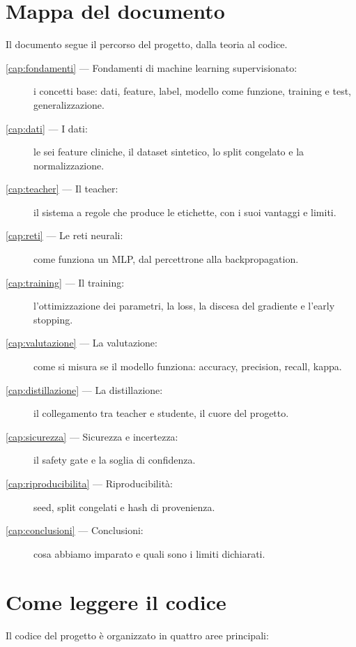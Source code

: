 \section{Mappa del documento}\label{sec:mappa-documento}

Il documento segue il percorso del progetto, dalla teoria al codice.

\begin{description}
  \item[\ref{cap:fondamenti} — Fondamenti di machine learning supervisionato:]
        i concetti base: dati, feature, label, modello come funzione,
        training e test, generalizzazione.
  \item[\ref{cap:dati} — I dati:] le sei feature cliniche, il dataset
        sintetico, lo split congelato e la normalizzazione.
  \item[\ref{cap:teacher} — Il teacher:] il sistema a regole che produce le
        etichette, con i suoi vantaggi e limiti.
  \item[\ref{cap:reti} — Le reti neurali:] come funziona un MLP, dal
        percettrone alla backpropagation.
  \item[\ref{cap:training} — Il training:] l'ottimizzazione dei parametri,
        la loss, la discesa del gradiente e l'early stopping.
  \item[\ref{cap:valutazione} — La valutazione:] come si misura se il modello
        funziona: accuracy, precision, recall, kappa.
  \item[\ref{cap:distillazione} — La distillazione:] il collegamento tra
        teacher e studente, il cuore del progetto.
  \item[\ref{cap:sicurezza} — Sicurezza e incertezza:] il safety gate e la
        soglia di confidenza.
  \item[\ref{cap:riproducibilita} — Riproducibilità:] seed, split congelati e
        hash di provenienza.
  \item[\ref{cap:conclusioni} — Conclusioni:] cosa abbiamo imparato e quali
        sono i limiti dichiarati.
\end{description}

\section{Come leggere il codice}\label{sec:come-leggere-codice}

Il codice del progetto è organizzato in quattro aree principali:

